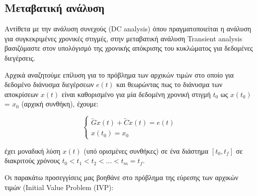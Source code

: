 \subsection{Μεταβατική ανάλυση}

Αντίθετα με την ανάλυση συνεχούς (\textlatin{DC analysis}) όπου πραγματοποιείται η ανάλυση για συγκεκριμένες χρονικές στιγμές, στην μεταβατική ανάλυση \textlatin{Transient analysis} βασιζόμαστε στον υπολόγισμό της χρονικής απόκρισης του κυκλώματος για δεδομένες διεγέρσεις.


Αρχικά αναζητούμε επίλυση για το πρόβλημα των αρχικών τιμών στο οποίο για δεδομένο διάνυσμα διεγέρσεων ${e}(t)$ και θεωρώντας πως το διάνυσμα των αποκρίσεων ${x}(t)$ είναι καθορισμένο για μία δεδομένη χρονική στιγμή $t_0$ ως ${x}(t_0)$ = ${x_0}$ (αρχική συνθήκη),
έχουμε:

\[
\begin{cases}
    \widetilde{G} {x}(t) + \widetilde{C}\dot{{x}}(t) = {e}(t) \\
     {x}(t_0) = {x_0}
\end{cases}
\]

έχει μοναδική λύση ${x}(t)$ (υπό ορισμένες συνθήκες) σε ένα διάστημα $[t_0 , t_f]$ σε διακριτούς χρόνους $t_0 < t_1 < t_2 < ... < t_m = t_f$.




Οι παρακάτω προσεγγίσεις μας βοηθάνε στο πρόβλημα της εύρεσης των αρχικών τιμών (\textlatin{Initial Value Problem (IVP)}:

